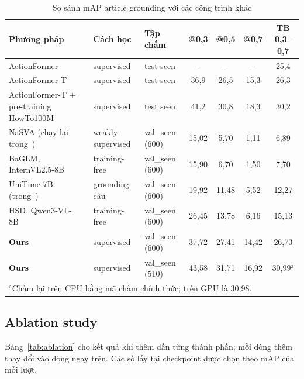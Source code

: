 \documentclass{IEEEtran}
\begin{document}
\begin{table}[t]
\caption{So sánh mAP article grounding với các công trình khác}
\label{tab:sota}
\centering
\begin{tabular}{|l|l|l|c|c|c|c|}
\hline
Phương pháp & Cách học & Tập chấm & @0,3 & @0,5 & @0,7 & TB 0,3--0,7 \\
\hline
ActionFormer~\cite{htstep} & supervised & test seen & -- & -- & -- & 25,4 \\
ActionFormer-T~\cite{htstep} & supervised & test seen & 36,9 & 26,5 & 15,3 & 26,3 \\
ActionFormer-T + pre-training HowTo100M~\cite{htstep} & supervised & test seen & 41,2 & 30,8 & 18,3 & 30,2 \\
\hline
NaSVA (chạy lại trong~\cite{hsd}) & weakly supervised & val\_seen (600) & 15,02 & 5,70 & 1,11 & 6,89 \\
BaGLM, InternVL2.5-8B~\cite{baglm} & training-free & val\_seen (600) & 15,90 & 6,70 & 1,50 & 7,70 \\
UniTime-7B (trong~\cite{hsd}) & grounding câu & val\_seen (600) & 19,92 & 11,48 & 5,52 & 12,27 \\
HSD, Qwen3-VL-8B~\cite{hsd} & training-free & val\_seen (600) & 26,45 & 13,78 & 6,16 & 15,13 \\
\hline
\textbf{Ours} & supervised & val\_seen (600) & 37,72 & 27,41 & 14,42 & 26,73 \\
\textbf{Ours} & supervised & val\_seen (510) & 43,58 & 31,71 & 16,92 & 30,99$^{\mathrm{a}}$ \\
\hline
\multicolumn{7}{l}{$^{\mathrm{a}}$Chấm lại trên CPU bằng mã chấm chính thức; trên GPU là 30,98.}\\
\end{tabular}
\end{table}

\subsection{Ablation study}
Bảng~\ref{tab:ablation} cho kết quả khi thêm dần từng thành phần; mỗi dòng thêm thay đổi vào dòng ngay trên. Các số lấy tại checkpoint được chọn theo mAP của mỗi lượt.
\end{document}
